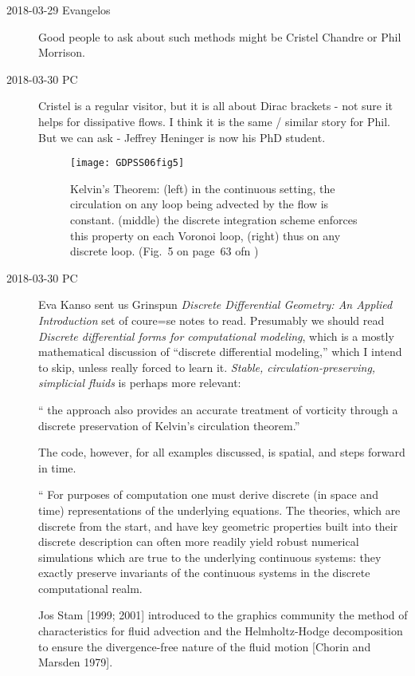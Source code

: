 \begin{description}
\item[2018-03-29 Evangelos]
Good people to ask about such methods might be
Cristel Chandre or Phil Morrison.

\item[2018-03-30 PC]
Cristel is a regular visitor, but it is all about Dirac brackets - not sure
it helps for dissipative flows. I think it is the same / similar story for
Phil. But we can ask - Jeffrey Heninger is now his PhD student.

\begin{figure}
\centering
    \texttt{[image: GDPSS06fig5]}
\caption{\label{fig:GDPSS06fig5}
Kelvin's Theorem: (left) in the continuous setting, the circulation
on any loop being advected by the flow is constant. (middle) the discrete
integration scheme enforces this property on each Voronoi loop, (right) thus
on any discrete loop. (Fig.~5 on page~63 ofn )
        }
\end{figure}


\item[2018-03-30 PC] Eva Kanso  sent us Grinspun \etal{}
{\em Discrete Differential Geometry: An Applied Introduction} set of coure=se
notes to read. Presumably we should read {\em Discrete differential forms for
computational modeling}, which is a mostly mathematical discussion of
``discrete differential modeling,'' which I intend to skip, unless really
forced to learn it. {\em Stable, circulation-preserving, simplicial fluids}
is perhaps more relevant:

`` the approach also provides an accurate treatment of vorticity through a
discrete preservation of Kelvin's circulation theorem.''

The code, however, for all examples discussed, is spatial, and steps forward in time.

``
For purposes of computation one must derive discrete (in space and time)
representations of the underlying equations. The theories, which are discrete
from the start, and have key geometric properties built into their discrete
description can often more readily yield robust numerical simulations which
are true to the underlying continuous systems: they exactly preserve
invariants of the continuous systems in the discrete computational realm.

Jos Stam [1999; 2001] introduced to the graphics community the method of
characteristics for fluid advection and the Helmholtz-Hodge decomposition to
ensure the divergence-free nature of the fluid motion [Chorin and Marsden
1979].


\end{description}

